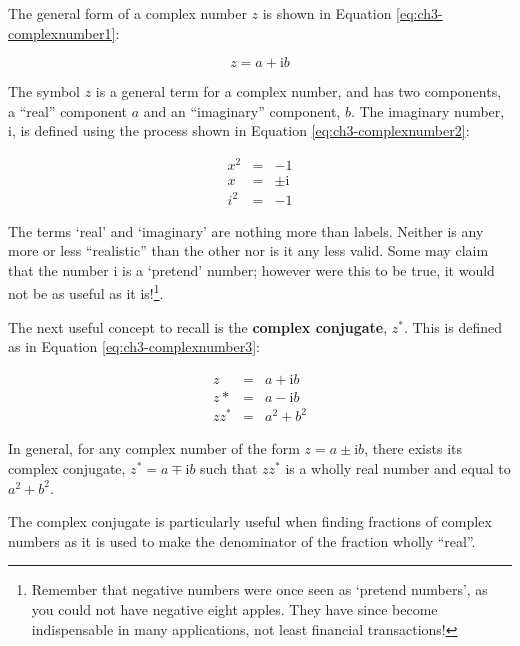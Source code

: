 \documentclass[
]{book}
\begin{document}
The general form of a complex number \(z\) is shown in Equation \eqref{eq:ch3-complexnumber1}:

\begin{equation}
z = a + \mathrm{i}b
\label{eq:ch3-complexnumber1}
\end{equation}

The symbol \(z\) is a general term for a complex number, and has two components, a ``real'' component \(a\) and an ``imaginary'' component, \(b\). The imaginary number, \(\mathrm{i}\), is defined using the process shown in Equation \eqref{eq:ch3-complexnumber2}:

\begin{equation}
\begin{array}{rcl}
x^2 &=& -1 \\
x &=& \pm \mathrm{i}\\
i^2 &=& -1
\end{array}
\label{eq:ch3-complexnumber2}
\end{equation}

The terms `real' and `imaginary' are nothing more than labels. Neither is any more or less ``realistic'' than the other nor is it any less valid. Some may claim that the number \(\mathrm{i}\) is a `pretend' number; however were this to be true, it would not be as useful as it is!\footnote{Remember that negative numbers were once seen as `pretend numbers', as you could not have negative eight apples. They have since become indispensable in many applications, not least financial transactions!}.

The next useful concept to recall is the \textbf{complex conjugate}, \(z^*\). This is defined as in Equation \eqref{eq:ch3-complexnumber3}:

\begin{equation}
\begin{array}{rcl}
z &=& a + \mathrm{i}b \\
z* &=& a - \mathrm{i}b \\
zz^* &=& a^2 + b^2
\end{array}
\label{eq:ch3-complexnumber3}
\end{equation}

In general, for any complex number of the form \(z = a \pm \mathrm{i}b\), there exists its complex conjugate, \(z^* = a \mp \mathrm{i}b\) such that \(zz^*\) is a wholly real number and equal to \(a^2 + b^2\).

The complex conjugate is particularly useful when finding fractions of complex numbers as it is used to make the denominator of the fraction wholly ``real''.
\end{document}
